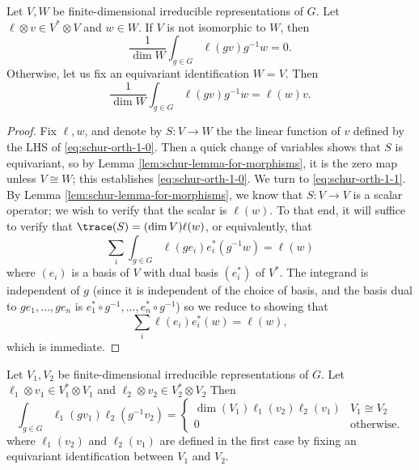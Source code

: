 \documentclass[reqno]{amsart} 
\begin{document}
\begin{lemma}\label{lem:schur-ortho-in-useful-form}
  Let $V,W$ be finite-dimensional irreducible representations
  of $G$.
  Let $\ell \otimes v \in V^* \otimes V$
  and $w \in W$.
  If $V$ is not isomorphic to $W$,
  then
  \begin{equation}\label{eq:schur-orth-1-0}
    \frac{1}{\dim W}
    \int_{g \in G} \ell(g v) g^{-1} w
    = 0.
  \end{equation}
  Otherwise,
  let us fix an equivariant identification
  $W = V$.
  Then
  \begin{equation}\label{eq:schur-orth-1-1}
    \frac{1}{\dim W}
    \int_{g \in G} \ell(g v) g^{-1} w
    = \ell(w) v.
  \end{equation}
\end{lemma}
\begin{proof}
  Fix $\ell,w$, and denote by $S : V \rightarrow W$ the
  the linear function of $v$ defined by the LHS of
  \eqref{eq:schur-orth-1-0}.
  Then a quick change of variables shows that $S$ is
  equivariant,
  so by Lemma \ref{lem:schur-lemma-for-morphisms},
  it is the zero map unless $V \cong W$;
  this establishes \eqref{eq:schur-orth-1-0}.
  We turn to \eqref{eq:schur-orth-1-1}.
  By Lemma \ref{lem:schur-lemma-for-morphisms},
  we know that $S : V \rightarrow V$ is a scalar operator;
  we wish to verify that the scalar is $\ell(w)$.
  To that end,
  it will suffice to verify that $\trace(S) = (\dim V) \ell(w)$,
  or equivalently,
  that
  \begin{equation*}
  \sum_{i}
  \int_{g \in G} \ell(g e_i) e_i^*(g^{-1} w)
  = \ell(w)
  \end{equation*}
  where $(e_i)$ is a basis of $V$ with dual basis $(e_i^*)$ of $V^*$.
  The integrand is independent of $g$
  (since it is independent of the choice of basis,
  and the basis dual to $g e_1,\dotsc,g e_n$ is $e_1^* \circ g^{-1}, \dotsc, e_n^* \circ g^{-1}$)
  so we reduce to showing that
  \begin{equation*}
  \sum_i \ell(e_i) e_i^*(w) = \ell(w),
  \end{equation*}
  which is immediate.
\end{proof}

\begin{corollary}
  Let
  $V_1, V_2$ be finite-dimensional irreducible representations
  of $G$.
  Let $\ell_1 \otimes v_1 \in V_1^* \otimes V_1$
  and $\ell_2 \otimes v_2 \in V_2^* \otimes V_2$
  Then
  \begin{equation}\label{eq:schur-orth-1-0b}
    \int_{g \in G} \ell_1(g v_1) \ell_2(g^{-1} v_2)
    =
    \begin{cases}
      \dim(V_1) \ell_1(v_2) \ell_2(v_1) & V_1 \cong V_2 \\
      0 & \text{otherwise.}
    \end{cases}
  \end{equation} 
  where $\ell_1(v_2)$ and $\ell_2(v_1)$ are defined
  in the first case by fixing an equivariant identification between $V_1$ and $V_2$.
\end{corollary}
\end{document}

